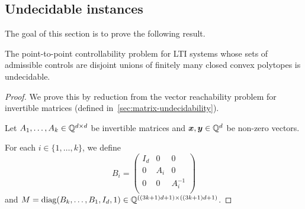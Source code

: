 \subsection{Undecidable instances}
\label{sec:lti_undecidability}

The goal of this section is to prove the following result.

\begin{theorem}
The point-to-point controllability problem for LTI systems whose sets of admissible controls are disjoint unions of finitely many closed convex polytopes is undecidable.
\end{theorem}

\begin{proof}
We prove this by reduction from the vector reachability problem for invertible matrices (defined in~\cref{sec:matrix-undecidability}).

Let $A_{1}, \ldots, A_{k} \in \mathbb{Q}^{d \times d}$ be invertible matrices and $\boldsymbol{x}, \boldsymbol{y} \in \mathbb{Q}^{d}$ be non-zero vectors.

For each $i \in \lbrace 1, \ldots, k \rbrace$, we define
\begin{equation*}
B_{i} =
\begin{pmatrix}
I_{d} & 0 & 0 \\
0 & A_{i} & 0 \\
0 & 0 & A_{i}^{-1} \\
\end{pmatrix}
\end{equation*}
and $M = \operatorname{diag}(B_{k}, \ldots, B_{1}, I_{d}, 1) \in \mathbb{Q}^{((3k+1)d+1) \times ((3k+1)d+1)}$.


\end{proof}
